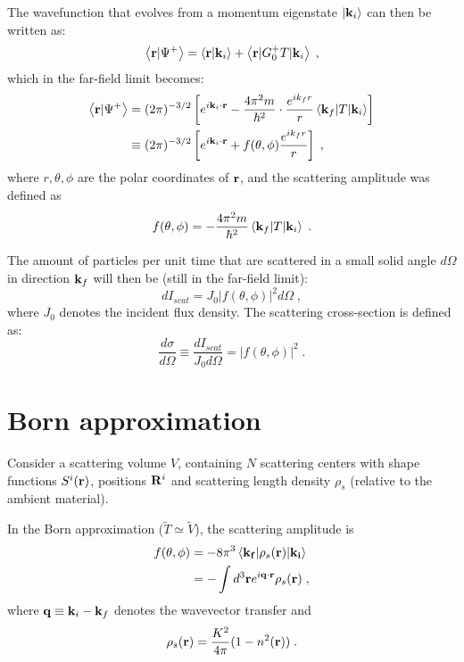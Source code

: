 The wavefunction that evolves from a momentum eigenstate $\vert \mathbf{k}_i \rangle$ can then be written as:
\begin{equation*}
  \left\langle \mathbf{r} \vert \Psi^+ \right\rangle = \left\langle \mathbf{r} \vert \mathbf{k}_i \right\rangle + \left\langle \mathbf{r} \vert G_0^+T \vert \mathbf{k}_i \right\rangle \; ,
\end{equation*}
which in the far-field limit becomes:
\begin{align*}
  \left\langle \mathbf{r} \vert \Psi^+ \right\rangle &= (2\pi)^{-3/2}\left[ e^{i\mathbf{k}_i\cdot\mathbf{r}} - \frac{4\pi^2m}{\hbar^2}\cdot\frac{e^{ik_f r}}{r} \left\langle \mathbf{k}_f \vert T \vert \mathbf{k}_i \right\rangle \right]  \\
  &\equiv (2\pi)^{-3/2}\left[ e^{i\mathbf{k}_i\cdot\mathbf{r}} + f(\theta,\phi)\frac{e^{ik_f r}}{r} \right] \; ,
\end{align*}
where $r,\theta,\phi$ are the polar coordinates of $\mathbf{r}$,
and the scattering amplitude was defined as
\begin{equation*}
  f(\theta, \phi) = -\frac{4\pi^2m}{\hbar^2}\left\langle \mathbf{k}_f \vert T \vert \mathbf{k}_i \right\rangle \; .
\end{equation*}

The amount of particles per unit time that are scattered in a small solid angle $d\Omega$ in direction $\mathbf{k}_f$ will then be (still in the far-field limit):
\begin{equation*}
  dI_{scat} = J_0\lvert f(\theta,\phi)\rvert^2d\Omega \; ,
\end{equation*}
where $J_0$ denotes the incident flux density. The scattering cross-section is defined as:
\begin{equation*}
  \frac{d\sigma}{d\Omega}\equiv \frac{dI_{scat}}{J_0 d\Omega} = \lvert f(\theta,\phi) \rvert^2 \; .
\end{equation*}




\section{Born approximation} \label{sec:ba}

Consider a scattering volume $V$, containing $N$ scattering centers with shape functions $S^i(\mathbf{r})$, positions $\mathbf{R}^i$ and scattering length density $\rho_s$ (relative to the ambient material).

In the Born approximation ($\widetilde{T}\simeq\widetilde{V}$), the scattering amplitude is
\begin{align*}
  f(\theta, \phi) & = -8\pi^3 \left\langle \mathbf{k_f} \vert \rho_s(\mathbf{r}) \vert \mathbf{k_i} \right\rangle \nonumber \\
  & = -\int d^3\mathbf{r} e^{i\mathbf{q}\cdot\mathbf{r}} \rho_s(\mathbf{r}) \; ,
\end{align*}
where $\mathbf{q}\equiv \mathbf{k}_i - \mathbf{k}_f$ denotes the wavevector transfer and
\begin{equation*}
  \rho_s(\mathbf{r}) = \frac{K^2}{4\pi}(1-n^2(\mathbf{r})) \; .
\end{equation*}

